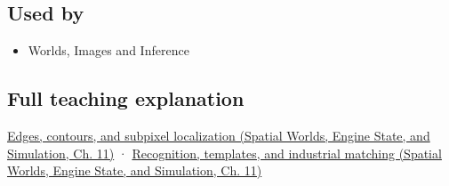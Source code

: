 \subsection{Used by}\label{appendix-a5b0383b3b3e-used-by}

\hypertarget{appendix-a5b0383b3b3e-used-by}{}

\begin{itemize}
\tightlist
\item
  {Worlds, Images and Inference}
\end{itemize}

\subsection{Full teaching explanation}\label{appendix-a5b0383b3b3e-full-teaching-explanation}

\hypertarget{appendix-a5b0383b3b3e-full-teaching-explanation}{}

\href{../05-Spatial-Worlds-Engine-State-and-Simulation/main.pdf\#nameddest=04-visual-computing-ii-ch030-edges-contours-and-subpixel-localization}{Edges, contours, and subpixel localization (Spatial Worlds, Engine State, and Simulation, Ch. 11)} · \href{../05-Spatial-Worlds-Engine-State-and-Simulation/main.pdf\#nameddest=04-visual-computing-ii-ch030-recognition-templates-and-industrial-matching}{Recognition, templates, and industrial matching (Spatial Worlds, Engine State, and Simulation, Ch. 11)}
